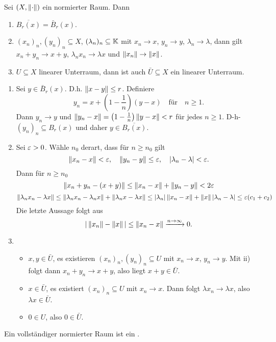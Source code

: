 \begin{lemma}
	Sei $ (X,\left\|\cdot\right\|) $ ein normierter Raum. Dann
	\begin{enumerate}
		\item $ \overline{B_r(x)}=\bar{B}_r(x) $.
		\item $ (x_n)_n, (y_n)_n\subseteq X$, $ (\lambda_n)_n\subseteq\mathbb{K} $ mit $ x_n\to x $, $ y_n\to y $, $ \lambda_n\to\lambda $, dann gilt $ x_n+y_n\to x+y $, $ \lambda_nx_n\to\lambda x $ und $ \left\|x_n\right\|\to\left\|x\right\| $.
		\item $ U\subseteq X $ linearer Unterraum, dann ist auch $ \bar U\subseteq X $ ein linearer Unterraum. 
	\end{enumerate}
\end{lemma}
\begin{beweis}
	\begin{enumerate}
		\item Sei $ y\in\bar B_r(x) $. D.h. $ \left\|x-y\right\|\leq r $. Definiere
		\[ y_n=x+\left(1-\frac{1}{n}\right)(y-x)\quad\text{f\"ur}\quad n\geq 1. \]
		Dann $ y_n\to y $ und $ \left\|y_n-x\right\|=\left(1-\frac{1}{n}\right)\left\|y-x\right\|<r $ f\"ur jedes $ n\geq 1 $. D-h- $ (y_n)_n\subseteq B_r(x) $ und daher $ y\in\overline{B_r(x)} $.
		\item Sei $ \varepsilon>0 $. W\"ahle $ n_0 $ derart, dass f\"ur $ n\geq n_0 $ gilt
		\[ \left\|x_n-x\right\|<\varepsilon,\quad \left\|y_n-y\right\|\leq\varepsilon,\quad |\lambda_n-\lambda|<\varepsilon. \]
		Dann f\"ur $ n\geq n_0 $
		\[ \left\|x_n+y_n-(x+y)\right\|\leq\left\|x_n-x\right\|+\left\|y_n-y\right\|<2\varepsilon \]
		\[ \left\|\lambda_nx_n-\lambda x\right\|\leq\left\|\lambda_nx_n-\lambda_nx\right\|+\left\|\lambda_n x-\lambda x\right\|\leq|\lambda_n|\left\|x_n-x\right\|+\left\|x\right\||\lambda_n-\lambda|\leq\varepsilon(c_1+c_2) \]
		Die letzte Aussage folgt aus
		\[ |\left\|x_n\right\|-\left\|x\right\||\leq\left\|x_n-x\right\|\xrightarrow{n\to\infty}0. \]
		\item \begin{itemize}
			\item $ x,y\in\bar U $, es existieren $ (x_n)_n,(y_n)_n\subseteq U $ mit $ x_n\to x $, $ y_n\to y $. Mit ii) folgt dann $ x_n+y_n\to x+y $, also liegt $ x+y\in\bar U $.
		\item $ x\in\bar U $, es existiert $ (x_n)_n\subseteq U $ mit $ x_n\to x $. Dann folgt $ \lambda x_n\to\lambda x $, also $ \lambda x\in \bar U $.
		\item $ 0\in U $, also $ 0\in\bar U $.
		\end{itemize}
	\end{enumerate}
\end{beweis}
\begin{definition}
	Ein vollst\"andiger normierter Raum ist ein .
\end{definition}
